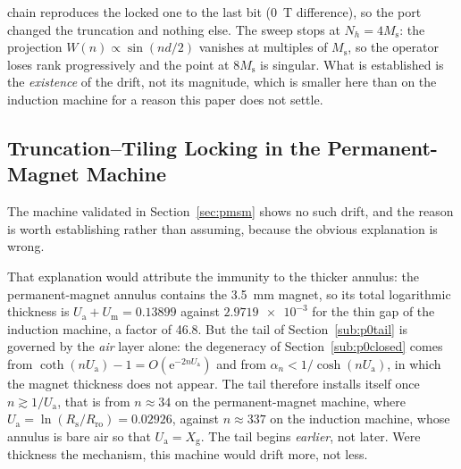 \documentclass[10pt,a4paper,twocolumn]{article}
\newcommand{\Rs}{R_{\mathrm{s}}}
\newcommand{\Rro}{R_{\mathrm{ro}}}
\newcommand{\Ua}{U_{\mathrm{a}}}
\newcommand{\Um}{U_{\mathrm{m}}}
\newcommand{\Xg}{X_{\mathrm{g}}}
\theoremstyle{plain}
\theoremstyle{remark}
\begin{document}
\begin{table}[!t]
\begin{threeparttable}
\begin{tablenotes}[flushleft]
chain reproduces the locked one to the last bit
(\SI{0}{\tesla} difference), so the port changed the truncation and
nothing else. The sweep stops at $N_h=4M_{\mathrm{s}}$: the projection
$W(n)\propto\sin(nd/2)$ vanishes at multiples of $M_{\mathrm{s}}$, so the
operator loses rank progressively and the point at $8M_{\mathrm{s}}$ is
singular. What is established is the \emph{existence} of the drift, not
its magnitude, which is smaller here than on the induction machine for a
reason this paper does not settle.
\end{tablenotes}
\end{threeparttable}
\caption{The increment diagnostic on a quantity known to carry the
logarithmic tail: successive doublings of the truncation, and the ratio
of successive increments. Ratios tending to unity are the signature of
the tail; ratios settling below unity indicate geometric convergence.}
\label{tab:trunc}
\end{table}

\subsection{Truncation--Tiling Locking in the Permanent-Magnet Machine}
\label{sub:v1}

The machine validated in Section~\ref{sec:pmsm} shows no such drift, and
the reason is worth establishing rather than assuming, because the
obvious explanation is wrong.

That explanation would attribute the immunity to the thicker annulus:
the permanent-magnet annulus contains the \SI{3.5}{\milli\metre} magnet,
so its total logarithmic thickness is
$\Ua+\Um=\num{0.13899}$ against $\num{2.9719e-3}$ for the
thin gap of the induction machine, a factor of \num{46.8}. But the tail
of Section~\ref{sub:p0tail} is governed by the \emph{air} layer alone:
the degeneracy of Section~\ref{sub:p0closed} comes from
$\coth(n\Ua)-1=O(\mathrm{e}^{-2n\Ua})$ and from
$\alpha_n<1/\cosh(n\Ua)$, in which the magnet thickness does not
appear. The tail therefore installs itself once $n\gtrsim1/\Ua$, that
is from $n\approx34$ on the permanent-magnet machine, where
$\Ua=\ln(\Rs/\Rro)=\num{0.02926}$, against
$n\approx337$ on the induction machine, whose annulus is bare air so
that $\Ua=\Xg$. The tail begins \emph{earlier},
not later. Were thickness the mechanism, this machine would drift more,
not less.
\end{document}
